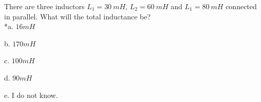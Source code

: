 
There are three inductors \( L_{1} = 30\ mH \), \( L_{2} = 60\ mH \) and \( L_{1} = 80\ mH \) connected in parallel. What will the total inductance be?\\ 

*a. \( 16 mH \)

b. \( 170 mH \)

c. \( 100 mH \)

d. \( 90 mH \)

e. I do not know.\\
